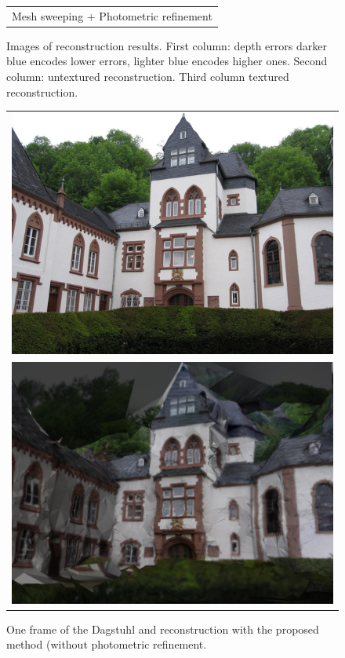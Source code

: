 \begin{figure}[t]
\begin{tabular}{ccc}
\multicolumn{3}{c}{Mesh sweeping + Photometric refinement}\\
\end{tabular}
\caption{Images of reconstruction results. First column: depth errors darker blue encodes lower errors, lighter blue encodes higher ones. Second column: untextured reconstruction. Third column textured reconstruction.}
\label{fig:fountainIm}
\end{figure}



\begin{figure}[t]
\setlength{\tabcolsep}{1px}
\centering
\begin{tabular}{c}
\includegraphics[width=0.8\columnwidth]{./img/dag004_smal}\\
\includegraphics[width=0.8\columnwidth]{./img/d_crop}\\
\end{tabular}
\caption{One frame of the Dagstuhl and reconstruction with the proposed method (without photometric refinement.}
\label{fig:Dagstuhl}
\end{figure}

